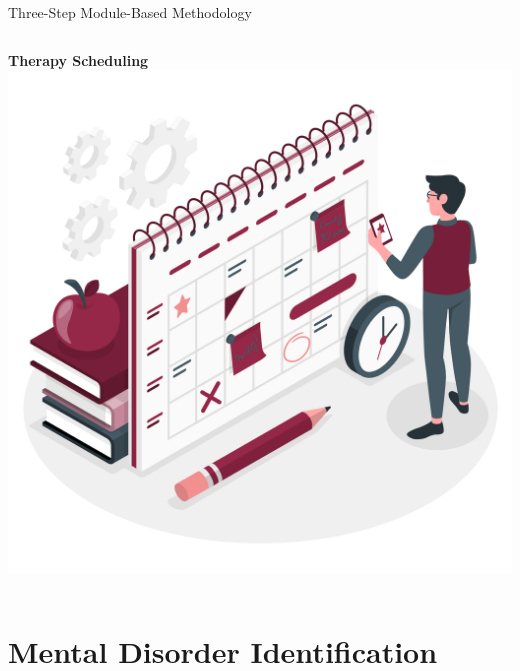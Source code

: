\documentclass[10pt, xcolor=table]{beamer}
\begin{document}
\begin{frame}{Three-Step Module-Based Methodology}
\begin{columns}[c]
		\centering
		\textbf{Therapy Scheduling} \\
		\includegraphics[width=\linewidth]{./figures/schedule.png}
	\end{columns}
\end{frame}

	\section*{Mental Disorder Identification}
	
\end{document}

